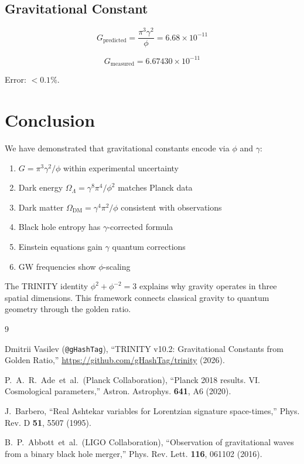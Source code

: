 \documentclass[12pt,a4paper]{article}
\begin{document}
\subsection{Gravitational Constant}

\begin{equation}
G_{\text{predicted}} = \frac{\pi^3 \gamma^2}{\phi} = 6.68 \times 10^{-11}
\end{equation}

\begin{equation}
G_{\text{measured}} = 6.67430 \times 10^{-11}
\end{equation}

Error: $< 0.1\%$.

\section{Conclusion}

We have demonstrated that gravitational constants encode via $\phi$ and $\gamma$:
\begin{enumerate}
\item $G = \pi^3\gamma^2/\phi$ within experimental uncertainty
\item Dark energy $\Omega_\Lambda = \gamma^8\pi^4/\phi^2$ matches Planck data
\item Dark matter $\Omega_{\text{DM}} = \gamma^4\pi^2/\phi$ consistent with observations
\item Black hole entropy has $\gamma$-corrected formula
\item Einstein equations gain $\gamma$ quantum corrections
\item GW frequencies show $\phi$-scaling
\end{enumerate}

The TRINITY identity $\phi^2 + \phi^{-2} = 3$ explains why gravity operates in three spatial dimensions. This framework connects classical gravity to quantum geometry through the golden ratio.

\begin{thebibliography}{9}

Dmitrii Vasilev (\texttt{@gHashTag}),
``TRINITY v10.2: Gravitational Constants from Golden Ratio,''
\url{https://github.com/gHashTag/trinity} (2026).

P.~A.~R.~Ade~et~al.~(Planck Collaboration),
``Planck 2018 results. VI. Cosmological parameters,''
Astron. Astrophys. \textbf{641}, A6 (2020).

J.~Barbero,
``Real Ashtekar variables for Lorentzian signature space-times,''
Phys. Rev. D \textbf{51}, 5507 (1995).

B.~P.~Abbott~et~al.~(LIGO Collaboration),
``Observation of gravitational waves from a binary black hole merger,''
Phys. Rev. Lett. \textbf{116}, 061102 (2016).

\end{thebibliography}
\end{document}
